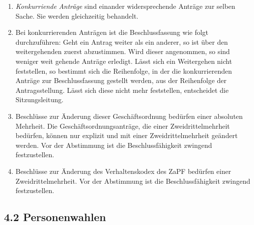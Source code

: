 \documentclass[12pt,oneside]{scrartcl}
\begin{document}
\begin{enumerate}
\item \emph{Konkurriende Anträge} sind einander widersprechende Anträge zur selben Sache.
Sie werden gleichzeitig behandelt.

\item Bei konkurrierenden Anträgen ist die Beschlussfassung wie folgt durchzuführen:
Geht ein Antrag weiter als ein anderer, so ist über den weitergehenden
zuerst abzustimmen.
Wird dieser angenommen, so sind weniger weit gehende Anträge erledigt.
Lässt sich ein Weitergehen nicht feststellen, so bestimmt sich die
Reihenfolge, in der die konkurrierenden Anträge zur Beschlussfassung
gestellt werden, aus der Reihenfolge der Antragsstellung.
Lässt sich diese nicht mehr feststellen, entscheidet die Sitzungsleitung.

\item Beschlüsse zur Änderung dieser Geschäftsordnung bedürfen einer absoluten
Mehrheit.
Die Geschäftsordnungsanträge, die einer Zweidrittelmehrheit bedürfen, können nur
explizit und mit einer Zweidrittelmehrheit geändert werden.
Vor der Abstimmung ist die Beschlussfähigkeit zwingend festzustellen.

\item Beschlüsse zur Änderung des Verhaltenskodex des ZaPF bedürfen einer
Zweidrittelmehrheit.
Vor der Abstimmung ist die Beschlussfähigkeit zwingend festzustellen.
\end{enumerate}


\subsection{4.2 Personenwahlen%
  \label{personenwahlen}%
}
\end{document}
